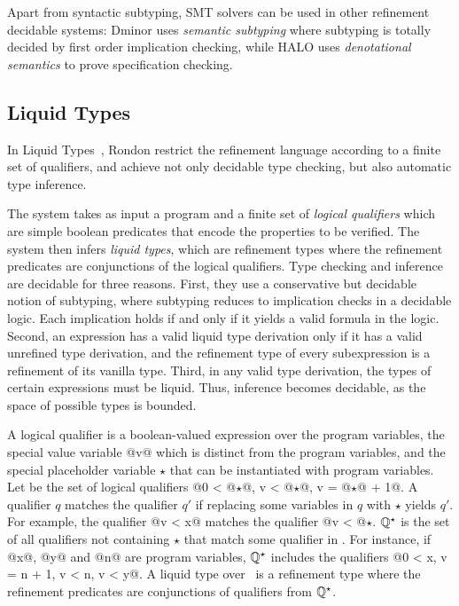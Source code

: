 Apart from syntactic subtyping, SMT solvers can be used in other 
refinement decidable systems:
Dminor \cite{dminor} uses \textit{semantic subtyping} where subtyping is totally 
decided by first order implication checking, while 
HALO \cite{VytiniotisJCR13} uses \textit{denotational semantics}
to prove specification checking.




%

\subsection{Liquid Types}\label{subsec:liquid}

In Liquid Types~\cite{LiquidPLDI08}, 
Rondon \etal restrict the refinement language according to a 
finite set of qualifiers, and achieve not only decidable type checking, but also automatic
type inference.

The system takes as input a program and 
a finite set of \textit{logical qualifiers}
which are simple boolean predicates 
that encode the properties to be verified. 
The system then infers
\textit{liquid types}, which are refinement types where the refinement predicates are conjunctions of the logical qualifiers.
Type checking and inference are decidable for
three reasons. 
%
First, they use a conservative but decidable
notion of subtyping, where 
subtyping reduces to implication checks in a decidable logic.
Each implication holds if and only if it yields a valid formula in
the logic. 
%
Second, an expression has a valid liquid type derivation
only if it has a valid unrefined type derivation, and the refinement 
type of every subexpression is a refinement of its vanilla type. 
%
Third, in any valid type derivation, the types of certain expressions
must be liquid. Thus, inference becomes decidable, as the space of
possible types is bounded. 


A logical qualifier is a
boolean-valued expression over the program variables, 
the special value variable @v@ which is distinct from the
program variables, and the special placeholder variable $\star$ that
can be instantiated with program variables. 
Let \qset be the set of logical qualifiers
@{0 < @$\star$@, v < @$\star$@,  v = @$\star$@ + 1}@. 
%
A qualifier $q$ matches the qualifier $q'$
if replacing some variables in $q$ with $\star$ yields $q'$.
For example, the qualifier
@v < x@ matches the qualifier @v < @$\star$. 
$\mathbb{Q}^\star$
is the set of all
qualifiers not containing $\star$ that match some qualifier in \qset. 
For instance, %
if @x@, @y@ and @n@ are program variables,
$\mathbb{Q}^\star$
includes the qualifiers
@{0 < x, v = n + 1, v < n, v < y}@. 
A liquid type over \qset\ is a refinement type where the refinement predicates are
conjunctions of qualifiers from $\mathbb{Q} ^ \star$.

